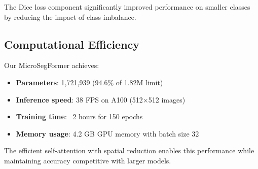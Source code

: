 The Dice loss component significantly improved performance on smaller classes by reducing the impact of class imbalance.

\subsection{Computational Efficiency}

Our MicroSegFormer achieves:
\begin{itemize}
    \item \textbf{Parameters}: 1,721,939 (94.6\% of 1.82M limit)
    \item \textbf{Inference speed}: 38 FPS on A100 (512×512 images)
    \item \textbf{Training time}: ~2 hours for 150 epochs
    \item \textbf{Memory usage}: 4.2 GB GPU memory with batch size 32
\end{itemize}

The efficient self-attention with spatial reduction enables this performance while maintaining accuracy competitive with larger models.
